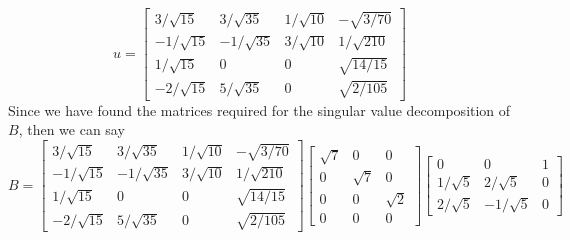 \documentclass{report}
\begin{document}
$$
u = \begin{bmatrix}
3/\sqrt{15}&3/\sqrt{35}&1/\sqrt{10}&-\sqrt{3/70}\\
-1/\sqrt{15}&-1/\sqrt{35}&3/\sqrt{10}&1/\sqrt{210}\\
1/\sqrt{15}&0&0&\sqrt{14/15}\\
-2/\sqrt{15}&5/\sqrt{35}&0&\sqrt{2/105}
\end{bmatrix}
$$
Since we have found the matrices required for the singular value decomposition of $B$, then we can say
$$
B = \begin{bmatrix}
3/\sqrt{15}&3/\sqrt{35}&1/\sqrt{10}&-\sqrt{3/70}\\
-1/\sqrt{15}&-1/\sqrt{35}&3/\sqrt{10}&1/\sqrt{210}\\
1/\sqrt{15}&0&0&\sqrt{14/15}\\
-2/\sqrt{15}&5/\sqrt{35}&0&\sqrt{2/105}
\end{bmatrix}
\begin{bmatrix}
\sqrt{7}&0&0\\
0&\sqrt{7}&0\\
0&0&\sqrt{2}\\
0&0&0
\end{bmatrix}
\begin{bmatrix}
0&0&1\\
1/\sqrt{5}&2/\sqrt{5}&0\\
2/\sqrt{5}&-1/\sqrt{5}&0
\end{bmatrix}
$$
\end{document}
